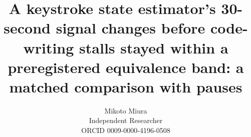 \documentclass[notitlepage,12pt]{jedm}
\begin{document}
\title{A keystroke state estimator's 30-second signal changes before code-writing stalls stayed within a
preregistered equivalence band: a matched comparison with pauses}
\date{}
\author{{\large Mikoto Miura}\\Independent Researcher\\ORCID 0009-0000-4196-0508}

\maketitle
















\appendix

\end{document}
